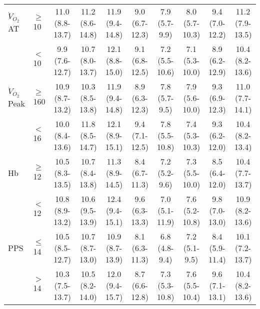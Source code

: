 \begin{sidewaystable}[p]
\begin{tabular}{|l l | cc cc cc cc |}
		$\dot{V}_{O_2}$AT   & $\geq$10  & 11.0 (8.8-13.7) & 11.2 (8.6-14.8) & 11.9 (9.4-14.8)  & 9.0 (6.7-12.3)  & 7.9 (5.7-9.9)  & 8.0 (5.7-10.3) & 9.4 (7.0-12.2)  & 11.2 (7.9-13.5) \\
		                    & $<$10     & 9.9 (7.6-12.7)  & 10.7 (8.0-13.7) & 12.1 (8.8-15.0)  & 9.1 (6.8-12.5)  & 7.2 (5.5-10.6) & 7.1 (5.3-10.0) & 8.9 (6.2-12.9)  & 10.4 (8.2-13.6) \\
		$\dot{V}_{O_2}$Peak & $\geq$160 & 10.9 (8.7-13.2) & 10.3 (8.5-13.8) & 11.9 (9.4-14.8)  & 8.9 (6.3-12.3)  & 7.8 (5.7-9.5)  & 7.9 (5.6-10.0) & 9.3 (6.9-12.3)  & 11.0 (7.7-14.1) \\
		                    & $<$16     & 10.0 (8.4-13.6) & 11.8 (8.5-14.7) & 12.1 (8.9-15.1)  & 9.4 (7.1-12.5)  & 7.8 (5.5-10.8) & 7.4 (5.3-10.3) & 9.3 (6.2-12.0)  & 10.4 (8.2-13.4) \\
		Hb                  & $\geq$12  & 10.5 (8.3-13.5) & 10.7 (8.4-13.8) & 11.3 (8.9-14.5)  & 8.4 (6.7-11.3)  & 7.2 (5.2-9.6)  & 7.3 (5.5-10.0) & 8.5 (6.4-12.0)  & 10.4 (7.7-13.7) \\
		                    & $<$12     & 10.8 (8.9-13.2) & 10.6 (9.5-13.9) & 12.4 (9.4-15.1)  & 9.6 (6.3-13.3)  & 7.0 (5.1-11.9) & 7.6 (5.2-10.8) & 9.8 (7.0-13.0)  & 10.9 (8.2-13.6) \\
		PPS                 & $\leq$14  & 10.5 (8.5-12.7) & 10.7 (8.7-13.0) & 10.9 (8.7-13.9)  & 8.1 (6.3-11.3)  & 6.8 (4.8-9.4)  & 7.2 (5.1-9.5)  & 8.4 (5.9-11.4)  & 10.1 (7.2-13.7) \\
		                    & $>$14     & 10.3 (7.5-13.7) & 10.5 (8.2-14.0) & 12.0 (9.4-15.7)  & 8.7 (6.6-12.8)  & 7.3 (5.3-10.8) & 7.6 (5.5-10.4) & 9.6 (7.1-13.1)  & 10.4 (8.2-13.6) \\ \hline
	\end{tabular}	
\end{sidewaystable}























